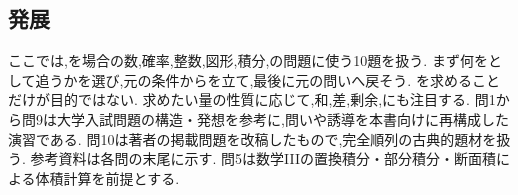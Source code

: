     \subsection{発展}\label{節：発展難易度}\label{節：大学過去問ベースのもの}
      ここでは,を場合の数,確率,整数,図形,積分,の問題に使う10題を扱う.
      まず何をとして追うかを選び,元の条件からを立て,最後に元の問いへ戻そう.
      を求めることだけが目的ではない. 求めたい量の性質に応じて,和,差,剰余,にも注目する.
      問1から問9は大学入試問題の構造・発想を参考に,問いや誘導を本書向けに再構成した演習である.
      問10は著者の掲載問題を改稿したもので,完全順列の古典的題材を扱う.
      参考資料は各問の末尾に示す. 問5は数学IIIの置換積分・部分積分・断面積による体積計算を前提とする.

